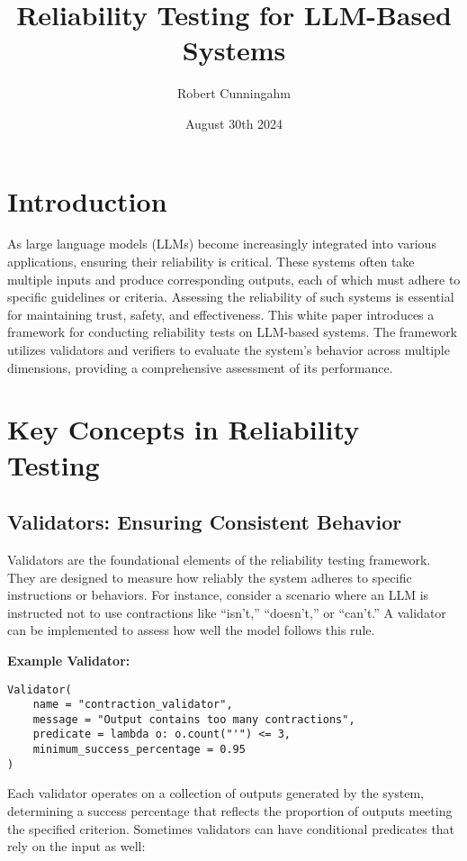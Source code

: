 \documentclass{article}
\title{Reliability Testing for LLM-Based Systems}
\author{Robert Cunningahm}
\date{August 30th 2024}
\begin{document}
\maketitle

\section{Introduction}

As large language models (LLMs) become increasingly integrated into various applications, ensuring their reliability is critical. These systems often take multiple inputs and produce corresponding outputs, each of which must adhere to specific guidelines or criteria. Assessing the reliability of such systems is essential for maintaining trust, safety, and effectiveness. This white paper introduces a framework for conducting reliability tests on LLM-based systems. The framework utilizes validators and verifiers to evaluate the system's behavior across multiple dimensions, providing a comprehensive assessment of its performance.

\vspace{1em}
\section{Key Concepts in Reliability Testing}

\subsection{Validators: Ensuring Consistent Behavior}

Validators are the foundational elements of the reliability testing framework. They are designed to measure how reliably the system adheres to specific instructions or behaviors. For instance, consider a scenario where an LLM is instructed not to use contractions like ``isn't,'' ``doesn't,'' or ``can't.'' A validator can be implemented to assess how well the model follows this rule.

\vspace{1em}
\textbf{Example Validator:}
\begin{lstlisting}
Validator(
    name = "contraction_validator",
    message = "Output contains too many contractions",
    predicate = lambda o: o.count("'") <= 3,
    minimum_success_percentage = 0.95
)
\end{lstlisting}

Each validator operates on a collection of outputs generated by the system, determining a success percentage that reflects the proportion of outputs meeting the specified criterion. Sometimes validators can have conditional predicates that rely on the input as well:
\end{document}
